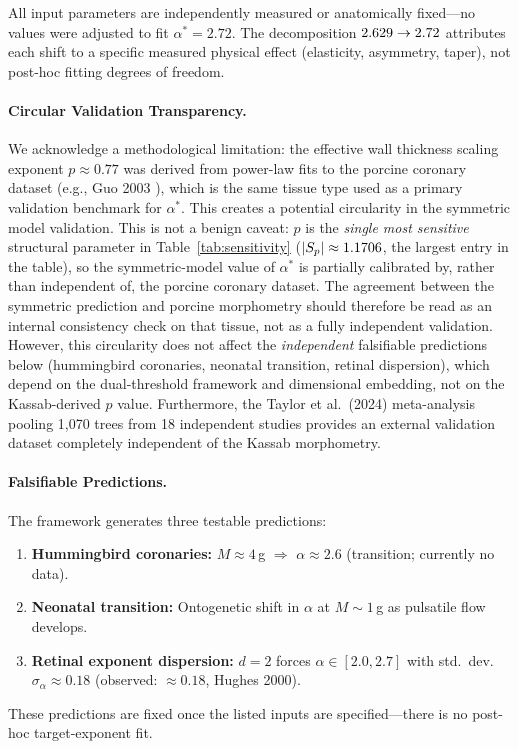 All input parameters are independently measured or anatomically fixed---no
values were adjusted to fit $\alpha^* = 2.72$. The decomposition
$2.629 \to 2.72$ attributes each shift to a specific measured
physical effect (elasticity, asymmetry, taper), not post-hoc fitting
degrees of freedom.

\paragraph{Circular Validation Transparency.}
We acknowledge a methodological limitation: the effective wall thickness scaling
exponent $p \approx 0.77$ was derived from power-law fits to the porcine
coronary dataset (e.g., Guo 2003 \cite{Guo2003}), which is the same tissue type
used as a primary validation benchmark for $\alpha^*$. This creates a potential
circularity in the symmetric model validation. This is not a benign caveat:
$p$ is the \emph{single most sensitive} structural parameter in
Table~\ref{tab:sensitivity} ($|S_p| \approx 1.1706$, the largest entry in the
table), so the symmetric-model value of $\alpha^*$ is partially calibrated by,
rather than independent of, the porcine coronary dataset. The agreement between
the symmetric prediction and porcine morphometry should therefore be read as an
internal consistency check on that tissue, not as a fully independent
validation. However, this circularity does not affect the \emph{independent}
falsifiable predictions below (hummingbird coronaries, neonatal transition,
retinal dispersion), which depend on the dual-threshold framework and
dimensional embedding, not on the Kassab-derived $p$ value. Furthermore, the
Taylor et al.~(2024) meta-analysis pooling 1,070 trees from 18 independent
studies provides an external validation dataset completely independent of the
Kassab morphometry.

\paragraph{Falsifiable Predictions.}

The framework generates three testable predictions:
\begin{enumerate}
\item
\textbf{Hummingbird coronaries:} $M \approx 4\,$g $\Rightarrow$ $\alpha
\approx 2.6$ (transition; currently no data).
\item
\textbf{Neonatal transition:} Ontogenetic shift in $\alpha$ at $M \sim 1\,$g as
pulsatile flow develops.
\item
\textbf{Retinal exponent dispersion:} $d=2$ forces $\alpha \in [2.0, 2.7]$ with
std.\ dev.\ $\sigma_\alpha \approx 0.18$ (observed: $\approx 0.18$, Hughes
2000).
\end{enumerate}
These predictions are fixed once the listed inputs are specified---there is
no post-hoc target-exponent fit.

